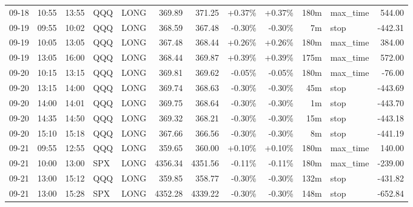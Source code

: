 \documentclass[11pt,a4paper,twoside]{article}
\begin{document}
\begin{center}
\begin{longtable}{>{\color{txtmain}}l l l l l r r r r r >{\color{txtmain}}l r}
09-18 & 10:55 & 13:55 & QQQ & LONG & 369.89 & 371.25 & \textcolor{wingreen}{+0.37\%} & \textcolor{wingreen}{+0.37\%} & 180m & max\_time & \textcolor{wingreen}{544.00} \\
09-19 & 09:55 & 10:02 & QQQ & LONG & 368.59 & 367.48 & \textcolor{lossred}{-0.30\%} & \textcolor{lossred}{-0.30\%} & 7m & stop & \textcolor{lossred}{-442.31} \\
09-19 & 10:05 & 13:05 & QQQ & LONG & 367.48 & 368.44 & \textcolor{wingreen}{+0.26\%} & \textcolor{wingreen}{+0.26\%} & 180m & max\_time & \textcolor{wingreen}{384.00} \\
09-19 & 13:05 & 16:00 & QQQ & LONG & 368.44 & 369.87 & \textcolor{wingreen}{+0.39\%} & \textcolor{wingreen}{+0.39\%} & 175m & max\_time & \textcolor{wingreen}{572.00} \\
09-20 & 10:15 & 13:15 & QQQ & LONG & 369.81 & 369.62 & \textcolor{lossred}{-0.05\%} & \textcolor{lossred}{-0.05\%} & 180m & max\_time & \textcolor{lossred}{-76.00} \\
09-20 & 13:15 & 14:00 & QQQ & LONG & 369.74 & 368.63 & \textcolor{lossred}{-0.30\%} & \textcolor{lossred}{-0.30\%} & 45m & stop & \textcolor{lossred}{-443.69} \\
09-20 & 14:00 & 14:01 & QQQ & LONG & 369.75 & 368.64 & \textcolor{lossred}{-0.30\%} & \textcolor{lossred}{-0.30\%} & 1m & stop & \textcolor{lossred}{-443.70} \\
09-20 & 14:35 & 14:50 & QQQ & LONG & 369.32 & 368.21 & \textcolor{lossred}{-0.30\%} & \textcolor{lossred}{-0.30\%} & 15m & stop & \textcolor{lossred}{-443.18} \\
09-20 & 15:10 & 15:18 & QQQ & LONG & 367.66 & 366.56 & \textcolor{lossred}{-0.30\%} & \textcolor{lossred}{-0.30\%} & 8m & stop & \textcolor{lossred}{-441.19} \\
09-21 & 09:55 & 12:55 & QQQ & LONG & 359.65 & 360.00 & \textcolor{wingreen}{+0.10\%} & \textcolor{wingreen}{+0.10\%} & 180m & max\_time & \textcolor{wingreen}{140.00} \\
09-21 & 10:00 & 13:00 & SPX & LONG & 4356.34 & 4351.56 & \textcolor{lossred}{-0.11\%} & \textcolor{lossred}{-0.11\%} & 180m & max\_time & \textcolor{lossred}{-239.00} \\
09-21 & 13:00 & 15:12 & QQQ & LONG & 359.85 & 358.77 & \textcolor{lossred}{-0.30\%} & \textcolor{lossred}{-0.30\%} & 132m & stop & \textcolor{lossred}{-431.82} \\
09-21 & 13:00 & 15:28 & SPX & LONG & 4352.28 & 4339.22 & \textcolor{lossred}{-0.30\%} & \textcolor{lossred}{-0.30\%} & 148m & stop & \textcolor{lossred}{-652.84} \\

\end{longtable}
\end{center}
\end{document}
